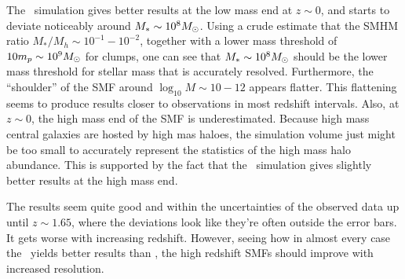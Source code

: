 The \gsmall\ simulation gives better results at the low mass end at $z \sim 0$, and starts to deviate noticeably around $M_* \sim 10^8 M_\odot$.
Using a crude estimate that the SMHM ratio $M_*/M_h \sim 10^{-1} - 10^{-2}$, together with a lower mass threshold of $10 m_p \sim 10^9 M_\odot$ for clumps, one can see that $M_* \sim 10^8M_\odot$ should be the lower mass threshold for stellar mass that is accurately resolved.
Furthermore, the ``shoulder'' of the SMF around $\log_{10}M \sim 10-12$ appears flatter. This flattening seems to produce results closer to observations in most redshift intervals.
Also, at $z\sim 0$, the high mass end of the SMF is underestimated.
Because high mass central galaxies are hosted by high mas haloes, the simulation volume just might be too small to accurately represent the statistics of the high mass halo abundance.
This is supported by the fact that the \glarge\ simulation gives slightly better results at the high mass end.

The results seem quite good and within the uncertainties of the observed data up until $z \sim 1.65$, where the deviations look like they're often outside the error bars. 
It gets worse with increasing redshift.
However, seeing how in almost every case the \gsmall\ yields better results than \glarge, the high redshift SMFs should improve with increased resolution.












